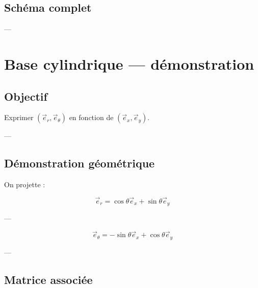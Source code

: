 \documentclass[11pt,a4paper]{article}
\begin{document}
\subsection{Schéma complet}

\begin{center}
\end{center}

---

\section{Base cylindrique — démonstration}

\subsection{Objectif}

Exprimer $(\vec{e}_r,\vec{e}_\theta)$ en fonction de $(\vec{e}_x,\vec{e}_y)$.

---

\subsection{Démonstration géométrique}

On projette :

\[
\vec{e}_r = \cos\theta \vec{e}_x + \sin\theta \vec{e}_y
\]

---

\[
\vec{e}_\theta = -\sin\theta \vec{e}_x + \cos\theta \vec{e}_y
\]

---

\subsection{Matrice associée}
\end{document}
